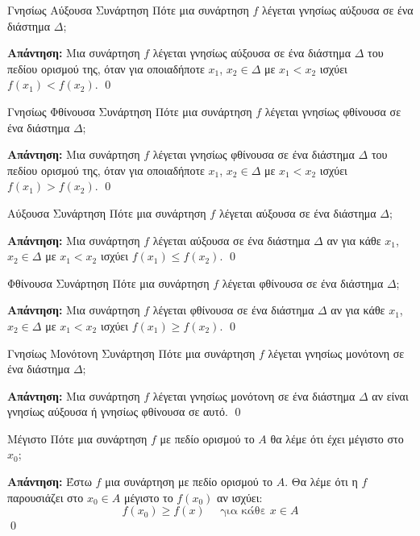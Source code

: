 \documentclass[a4paper, 12pt]{article}
\renewenvironment{proof}[1][\textbf{Απάντηση}]{%
  \par\noindent\textbf{#1:} \rmfamily}{\qed\par}
\begin{document}
\begin{theorem}{Γνησίως Αύξουσα Συνάρτηση}
  Πότε μια συνάρτηση $f$ λέγεται γνησίως αύξουσα σε ένα διάστημα $Δ$;
\end{theorem}
\begin{proof}
  Μια συνάρτηση $f$ λέγεται γνησίως αύξουσα σε ένα διάστημα $Δ$ του πεδίου ορισμού της, όταν για οποιαδήποτε $x_1$, $x_2 \in Δ$ με $x_1 < x_2$ ισχύει $f(x_1) < f(x_2)$.
\end{proof}

\begin{theorem}{Γνησίως Φθίνουσα Συνάρτηση}
  Πότε μια συνάρτηση $f$ λέγεται γνησίως φθίνουσα σε ένα διάστημα $Δ$;
\end{theorem}
\begin{proof}
  Μια συνάρτηση $f$ λέγεται γνησίως φθίνουσα σε ένα διάστημα $Δ$ του πεδίου ορισμού της, όταν για οποιαδήποτε $x_1$, $x_2 \in Δ$ με $x_1 < x_2$ ισχύει $f(x_1) > f(x_2)$.
\end{proof}

\begin{theorem}{Αύξουσα Συνάρτηση}
  Πότε μια συνάρτηση $f$ λέγεται αύξουσα σε ένα διάστημα $Δ$;
\end{theorem}
\begin{proof}
  Μια συνάρτηση $f$ λέγεται αύξουσα σε ένα διάστημα $Δ$ αν για κάθε $x_1$, $x_2 \in Δ$ με $x_1 < x_2$ ισχύει $f(x_1) \leq f(x_2)$.
\end{proof}

\begin{theorem}{Φθίνουσα Συνάρτηση}
  Πότε μια συνάρτηση $f$ λέγεται φθίνουσα σε ένα διάστημα $Δ$;
\end{theorem}
\begin{proof}
  Μια συνάρτηση $f$ λέγεται φθίνουσα σε ένα διάστημα $Δ$ αν για κάθε $x_1$, $x_2 \in Δ$ με $x_1 < x_2$ ισχύει $f(x_1) \geq f(x_2)$.
\end{proof}

\begin{theorem}{Γνησίως Μονότονη Συνάρτηση}
  Πότε μια συνάρτηση $f$ λέγεται γνησίως μονότονη σε ένα διάστημα $Δ$;
\end{theorem}
\begin{proof}
  Μια συνάρτηση $f$ λέγεται γνησίως μονότονη σε ένα διάστημα $Δ$ αν είναι γνησίως αύξουσα ή γνησίως φθίνουσα σε αυτό.
\end{proof}

\begin{theorem}{Μέγιστο}
  Πότε μια συνάρτηση $f$ με πεδίο ορισμού το $A$ θα λέμε ότι έχει μέγιστο στο $x_0$;
\end{theorem}
\begin{proof}
  Έστω $f$ μια συνάρτηση με πεδίο ορισμού το $A$. Θα λέμε ότι η $f$ παρουσιάζει στο $x_0\in Α$ μέγιστο το $f(x_0)$ αν ισχύει:
  $$f(x_0) \geq f(x) \quad \text{ για κάθε } x \in A$$
\end{proof}
\end{document}
